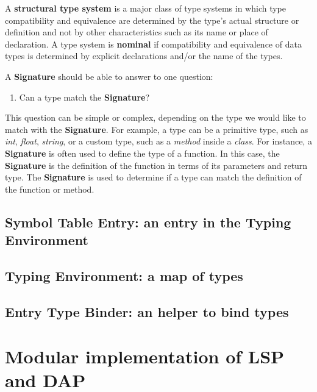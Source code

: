 A \textbf{structural type system} is a major class of type systems in which type compatibility and equivalence are determined by the type's actual structure or definition and not by other characteristics such as its name or place of declaration. A type system is \textbf{nominal} if compatibility and equivalence of data types is determined by explicit declarations and/or the name of the types.

A \textbf{Signature} should be able to answer to one question:

\begin{enumerate}
    \item Can a type match the \textbf{Signature}?
\end{enumerate}

This question can be simple or complex, depending on the type we would like to match with the \textbf{Signature}. For example, a type can be a primitive type, such as \textit{int}, \textit{float}, \textit{string}, or a custom type, such as a \textit{method} inside a \textit{class}.
For instance, a \textbf{Signature} is often used to define the type of a function. In this case, the \textbf{Signature} is the definition of the function in terms of its parameters and return type. The \textbf{Signature} is used to determine if a type can match the definition of the function or method.

\subsection{Symbol Table Entry: an entry in the Typing Environment}\label{subsec:concept:SymbolTableEntryAnEntryInTheTypingEnvironment}

\subsection{Typing Environment: a map of types}\label{subsec:concept:TypingEnvironmentAMapOfTypes}


\subsection{Entry Type Binder: an helper to bind types}\label{subsec:concept:EntryTypeBinderAnHelperToBindTypes}



\section{Modular implementation of LSP and DAP}\label{sec:concept:ModularImplementationOfLSPAndDAP}

